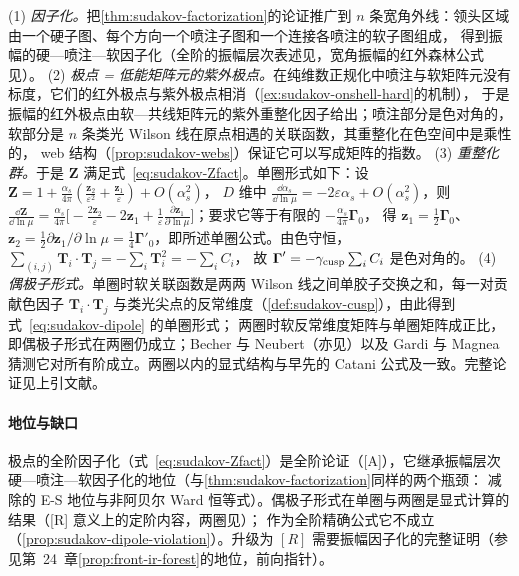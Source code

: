 \begin{proofsketch}
(1) \emph{因子化。}把\cref{thm:sudakov-factorization}的论证推广到 $n$ 条宽角外线：领头区域由一个硬子图、每个方向一个喷注子图和一个连接各喷注的软子图组成，
得到振幅的硬—喷注—软因子化\cite{Sen1983}（全阶的振幅层次表述见\cite{FeigeSchwartz2014}，宽角振幅的红外森林公式见\cite{Ma2020}）。
(2) \emph{极点 = 低能矩阵元的紫外极点。}在纯维数正规化中喷注与软矩阵元没有标度，它们的红外极点与紫外极点相消（\cref{ex:sudakov-onshell-hard}的机制），
于是振幅的红外极点由软—共线矩阵元的紫外重整化因子给出；喷注部分是色对角的，软部分是 $n$ 条类光 Wilson 线在原点相遇的关联函数，其重整化在色空间中是乘性的，
web 结构（\cref{prop:sudakov-webs}）保证它可以写成矩阵的指数\cite{Becher:2009cu,Becher:2009qa,DixonMagneaSterman2008}。
(3) \emph{重整化群。}于是 $\mathbf Z$ 满足式~\eqref{eq:sudakov-Zfact}。单圈形式如下：设 $\mathbf Z=1+\frac{\alpha_s}{4\pi}(\frac{\mathbf z_2}{\varepsilon^2}+\frac{\mathbf z_1}{\varepsilon})+O(\alpha_s^2)$，
$D$ 维中 $\frac{\dd\alpha_s}{\dd\ln\mu}=-2\varepsilon\alpha_s+O(\alpha_s^2)$，则
$\frac{\dd\mathbf Z}{\dd\ln\mu}=\frac{\alpha_s}{4\pi}\big[-\frac{2\mathbf z_2}{\varepsilon}-2\mathbf z_1+\frac1\varepsilon\frac{\partial\mathbf z_1}{\partial\ln\mu}\big]$；要求它等于有限的 $-\frac{\alpha_s}{4\pi}\boldsymbol\Gamma_0$，
得 $\mathbf z_1=\frac12\boldsymbol\Gamma_0$、$\mathbf z_2=\frac12\partial\mathbf z_1/\partial\ln\mu=\frac14\boldsymbol\Gamma'_0$，即所述单圈公式。由色守恒，$\sum_{(i,j)}\mathbf T_i\cdot\mathbf T_j=-\sum_i\mathbf T_i^2=-\sum_iC_i$，
故 $\boldsymbol\Gamma'=-\gamma_{\rm cusp}\sum_iC_i$ 是色对角的。
(4) \emph{偶极子形式。}单圈时软关联函数是两两 Wilson 线之间单胶子交换之和，每一对贡献色因子 $\mathbf T_i\cdot\mathbf T_j$ 与类光尖点的反常维度（\cref{def:sudakov-cusp}），由此得到式~\eqref{eq:sudakov-dipole} 的单圈形式；
两圈时软反常维度矩阵与单圈矩阵成正比\cite{Aybat:2006mz}，即偶极子形式在两圈仍成立；Becher 与 Neubert\cite[式~(7)]{Becher:2009cu}（亦见\cite[式~(7)]{Becher:2009qa}）以及 Gardi 与 Magnea\cite{Gardi:2009qi}
猜测它对所有阶成立。两圈以内的显式结构与早先的 Catani 公式\cite{Catani:1998bh}及\cite{Sterman:2002qn}一致。完整论证见上引文献。
\end{proofsketch}

\paragraph{地位与缺口}极点的全阶因子化（式~\eqref{eq:sudakov-Zfact}）是全阶论证（[A]），它继承振幅层次硬—喷注—软因子化的地位（与\cref{thm:sudakov-factorization}同样的两个瓶颈：
减除的 E-S 地位与非阿贝尔 Ward 恒等式）。偶极子形式在单圈与两圈是显式计算的结果（[R] 意义上的定阶内容，两圈见\cite{Aybat:2006mz}）；
作为全阶精确公式它不成立（\cref{prop:sudakov-dipole-violation}）。升级为 $[R]$ 需要振幅因子化的完整证明（参见第~24~章\cref{prop:front-ir-forest}的地位，前向指针）。

